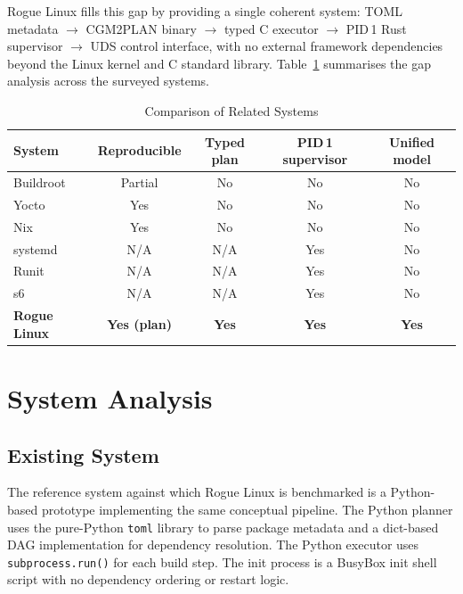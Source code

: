 \documentclass[12pt,a4paper]{report}
\begin{document}
Rogue Linux fills this gap by providing a single coherent system: TOML metadata
$\to$ CGM2PLAN binary $\to$ typed C executor $\to$ PID\,1 Rust supervisor $\to$
UDS control interface, with no external framework dependencies beyond the Linux
kernel and C standard library. Table~\ref{tab:comparison} summarises the gap
analysis across the surveyed systems.

\begin{table}[H]
\centering
\caption{Comparison of Related Systems}
\label{tab:comparison}
\renewcommand{\arraystretch}{1.2}
\begin{tabularx}{\linewidth}{X c c c c}
\toprule
\textbf{System} & \textbf{Reproducible} & \textbf{Typed plan} & \textbf{PID\,1 supervisor} & \textbf{Unified model}\\
\midrule
Buildroot  & Partial & No  & No  & No \\
Yocto      & Yes     & No  & No  & No \\
Nix        & Yes     & No  & No  & No \\
systemd    & N/A     & N/A & Yes & No \\
Runit      & N/A     & N/A & Yes & No \\
s6         & N/A     & N/A & Yes & No \\
\textbf{Rogue Linux} & \textbf{Yes (plan)} & \textbf{Yes} & \textbf{Yes} & \textbf{Yes}\\
\bottomrule
\end{tabularx}
\end{table}

\chapter{System Analysis}

\section{Existing System}

The reference system against which Rogue Linux is benchmarked is a Python-based
prototype implementing the same conceptual pipeline. The Python planner uses the
pure-Python \texttt{toml} library to parse package metadata and a dict-based DAG
implementation for dependency resolution. The Python executor uses
\texttt{subprocess.run()} for each build step. The init process is a BusyBox init
shell script with no dependency ordering or restart logic.
\end{document}
